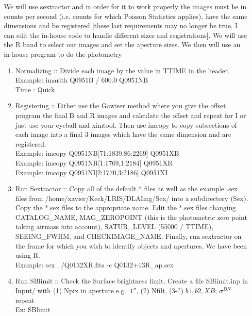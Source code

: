 \documentclass[11pt,letterpaper,dvips]{article}
\begin{document}
\begin{enumerate}
	We will use sextractor and in order for it to work properly
	the images must be in counts per second (i.e. counts for which Poisson Statistics applies),
	have the same dimensions and be registered [these last requirements
	may no longer be true, I can edit the in-house code to handle
	different sizes and registrations].
	We will use the R band to select our images
	and set the aperture sizes.  We then will use an in-house 
	program to do the photometry
	
	\begin{enumerate}

	  \item Normalizing :: Divide each image by the value in TTIME in
		the header. \\
         	\quad Example: imarith Q0951B / 600.0  Q0951NB \\
	        \quad Time   : Quick 

	  \item Registering :: Either use the Gawiser method where you give the
		offset program the final B and R images and calculate the
		offset and repeat for I or just use your eyeball and ximtool.  
		Then use imcopy to copy subsections of each image into a 
		final 3 images which have the same dimension and are 
		registered. \\
         	\quad Example: imcopy Q0951NB[71:1839,86:2269] Q0951XB \\
         	\quad Example: imcopy Q0951NR[1:1769,1:2184] Q0951XR \\
         	\quad Example: imcopy Q0951NI[2:1770,3:2186] Q0951XI 


	  \item Run Sextractor :: Copy all of the default.* files 
	  	as well as the example .sex files from
		/home/xavier/Keck/LRIS/DLAImg/Sex/ into a subdirectory (Sex).
		Copy the *.sex files to the appropriate name.  Edit the *.sex
		files changing CATALOG\_NAME, MAG\_ZEROPOINT (this is the
		photometric zero point taking airmass into account), 
		SATUR\_LEVEL (55000 / TTIME), 
		SEEING\_FWHM, and CHECKIMAGE\_NAME. Finally, run sextractor
		on the frame for which you wish to identify objects and
		apertures.  We have been using R.\\
         	\quad Example: sex ../Q0132XR.fits -c Q0132+13R\_ap.sex \\

	  \item Run SBlimit :: Check the Surface brightness limit.  Create
		a file SBlimit.inp in Input/
		with (1) Npix in aperture e.g.\ $1''$,
		(2) Nfilt, (3-?) $b1, b2, XB$; $\sigma^{DN}$ repeat \\
         	\quad Ex: SBlimit


\end{enumerate}
\end{enumerate}
\end{document}
